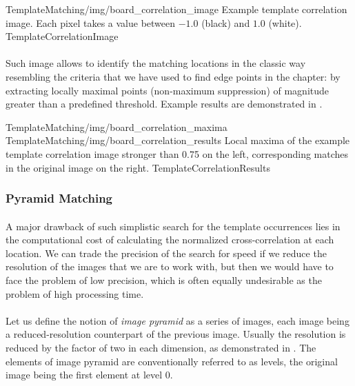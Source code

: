 \oneFigure
{TemplateMatching/img/board_correlation_image}
{Example template correlation image. Each pixel takes a value between $-1.0$ (black) and $1.0$ (white).}
{TemplateCorrelationImage}
{\basicWidth}

\paragraph*{}
Such image allows to identify the matching locations in the classic way resembling the criteria that we have used to find edge points in the  chapter: by extracting locally maximal points (non-maximum suppression) of magnitude greater than a predefined threshold. Example results are demonstrated in .

\twoFigures
{TemplateMatching/img/board_correlation_maxima}
{TemplateMatching/img/board_correlation_results}
{Local maxima of the example template correlation image stronger than 0.75 on the left, corresponding matches in the original image on the right.}
{TemplateCorrelationResults}
{\basicWidth}

\subsubsection{Pyramid Matching}

\paragraph*{}
A major drawback of such simplistic search for the template occurrences lies in the computational cost of calculating the normalized cross-correlation at each location. We can trade the precision of the search for speed if we reduce the resolution of the images that we are to work with, but then we would have to face the problem of low precision, which is often equally undesirable as the problem of high processing time.

\paragraph*{}
Let us define the notion of \textit{image pyramid} as a series of images, each image being a reduced-resolution counterpart of the previous image. Usually the resolution is reduced by the factor of two in each dimension, as demonstrated in . The elements of image pyramid are conventionally referred to as levels, the original image being the first element at level 0.

